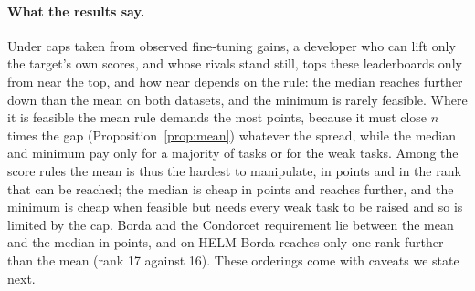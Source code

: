 \documentclass{article}
\begin{document}
\paragraph{What the results say.}
Under caps taken from observed fine-tuning gains, a developer who can lift only the target's own scores, and whose rivals stand still, tops these leaderboards only from near the top, and how near depends on the rule: the median reaches further down than the mean on both datasets, and the minimum is rarely feasible. Where it is feasible the mean rule demands the most points, because it must close $n$ times the gap (Proposition~\ref{prop:mean}) whatever the spread, while the median and minimum pay only for a majority of tasks or for the weak tasks. Among the score rules the mean is thus the hardest to manipulate, in points and in the rank that can be reached; the median is cheap in points and reaches further, and the minimum is cheap when feasible but needs every weak task to be raised and so is limited by the cap. Borda and the Condorcet requirement lie between the mean and the median in points, and on HELM Borda reaches only one rank further than the mean (rank 17 against 16). These orderings come with caveats we state next.
\end{document}

